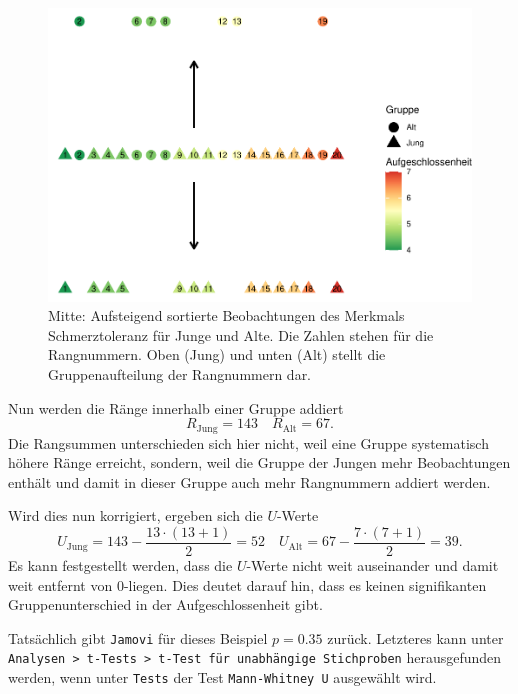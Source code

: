 \documentclass[
]{book}
\theoremstyle{definition}
\theoremstyle{definition}
\theoremstyle{definition}
\theoremstyle{definition}
\theoremstyle{remark}
\begin{document}
\begin{figure}

{\centering \includegraphics{aps_statistik1_files/figure-latex/exm-aufgeschlossenheit-jung-alt-utest-oder-1} 

}

\caption{Mitte: Aufsteigend sortierte Beobachtungen des Merkmals Schmerztoleranz für Junge und Alte. Die Zahlen stehen für die Rangnummern. Oben (Jung) und unten (Alt) stellt die Gruppenaufteilung der Rangnummern dar.}\label{fig:exm-aufgeschlossenheit-jung-alt-utest-oder}
\end{figure}

Nun werden die Ränge innerhalb einer Gruppe addiert
\[R_\text{Jung} = 143   \quad R_\text{Alt} = 67.\] Die Rangsummen
unterschieden sich hier nicht, weil eine Gruppe systematisch höhere
Ränge erreicht, sondern, weil die Gruppe der Jungen mehr Beobachtungen
enthält und damit in dieser Gruppe auch mehr Rangnummern addiert werden.

Wird dies nun korrigiert, ergeben sich die \(U\)-Werte
\[U_\text{Jung} = 143 - \frac{13\cdot(13+1)}{2} = 52 \quad U_\text{Alt} = 67-\frac{7\cdot(7+1)}{2} = 39.\]
Es kann festgestellt werden, dass die \(U\)-Werte nicht weit auseinander
und damit weit entfernt von \(0\)-liegen. Dies deutet darauf hin, dass es
keinen signifikanten Gruppenunterschied in der Aufgeschlossenheit gibt.

Tatsächlich gibt \texttt{Jamovi} für dieses Beispiel \(p = 0.35\) zurück.
Letzteres kann unter
\texttt{Analysen\ \textgreater{}\ t-Tests\ \textgreater{}\ t-Test\ für\ unabhängige\ Stichproben} herausgefunden
werden, wenn unter \texttt{Tests} der Test \texttt{Mann-Whitney\ U} ausgewählt wird.
\end{document}
